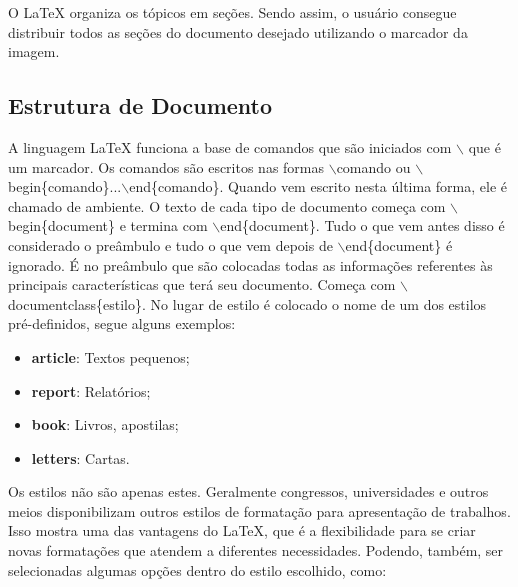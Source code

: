 \documentclass[12pt]{article}
\begin{document}
			O LaTeX organiza os tópicos em seções. Sendo assim, o usuário consegue distribuir todos as seções do documento desejado utilizando o marcador da imagem.
		    
		    
		\subsection{Estrutura de Documento}
			A linguagem LaTeX funciona a base de comandos que são iniciados com $\backslash$ que é um marcador. Os comandos são escritos nas formas $\backslash$comando ou $\backslash$begin\{{comando}\}...$\backslash$end\{{comando}\}. Quando vem escrito nesta última forma, ele é chamado de ambiente. O texto de cada tipo de documento começa com $\backslash$begin\{{document}\} e termina com $\backslash$end\{{document}\}. Tudo o que vem antes disso é considerado o preâmbulo e tudo o que vem depois de $\backslash$end\{{document}\} é ignorado. É no preâmbulo que são colocadas todas as informações referentes às principais características que terá seu documento. Começa com $\backslash$documentclass\{{estilo}\}. No lugar de estilo é colocado o nome de um dos estilos pré-definidos, segue alguns exemplos:
			\begin{itemize}
				\item \textbf {article}: Textos pequenos;
				\item \textbf {report}: Relatórios;
				\item \textbf {book}:  Livros, apostilas;
				\item \textbf {letters}: Cartas.
			\end{itemize}
			Os estilos não são apenas estes. Geralmente congressos, universidades e outros meios disponibilizam outros estilos de formatação para apresentação de trabalhos. Isso mostra uma das vantagens do LaTeX, que é a flexibilidade para se criar novas formatações que atendem a diferentes necessidades.
			Podendo, também, ser selecionadas algumas opções dentro do estilo escolhido, como:
\end{document}
